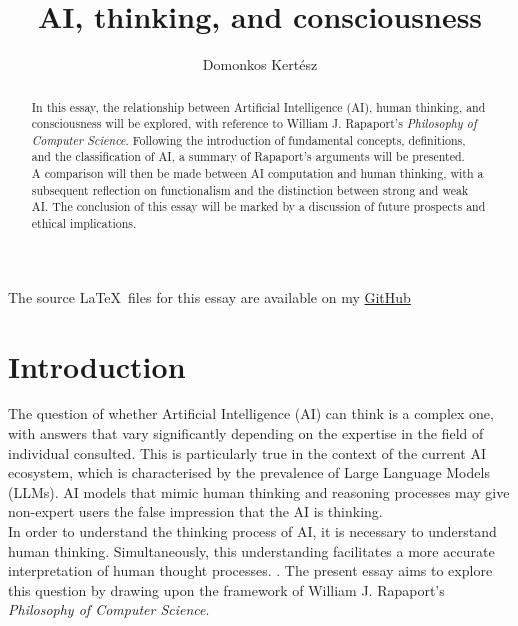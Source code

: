 \documentclass[runningheads]{llncs}
\begin{document}
%
%
\title{AI, thinking, and consciousness}
\author{Domonkos Kertész\\
}
%
%
\maketitle
%
%
\begin{center}
The source \LaTeX\ files for this essay are available on my \href{https://github.com/KihiraLove/SDU-Works/tree/main/Science%20Philosophy}{GitHub}
\end{center}
%
%
\begin{abstract}
In this essay, the relationship between Artificial Intelligence (AI), human thinking, and consciousness will be explored, with reference to William J. Rapaport's \textit{Philosophy of Computer Science}. Following the introduction of fundamental concepts, definitions, and the classification of AI, a summary of Rapaport's arguments will be presented.
\\
A comparison will then be made between AI computation and human thinking, with a subsequent reflection on functionalism and the distinction between strong and weak AI. The conclusion of this essay will be marked by a discussion of future prospects and ethical implications.
\end{abstract}
%
%
%
%
%
\section{Introduction}
%
The question of whether Artificial Intelligence (AI) can think is a complex one, with answers that vary significantly depending on the expertise in the field of individual consulted. This is particularly true in the context of the current AI ecosystem, which is characterised by the prevalence of Large Language Models (LLMs). AI models that mimic human thinking and reasoning processes may give non-expert users the false impression that the AI is thinking.
\\
In order to understand the thinking process of AI, it is necessary to understand human thinking. Simultaneously, this understanding facilitates a more accurate interpretation of human thought processes.
\cite{rapaport}. 
The present essay aims to explore this question by drawing upon the framework of William J. Rapaport's \textit{Philosophy of Computer Science}.
%
%
\end{document}
